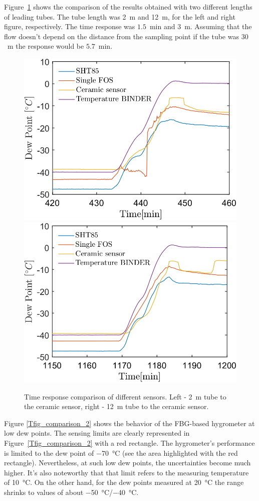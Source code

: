 Figure~\ref{fig_comparison_hw} shows the comparison of the results obtained with two different lengths of leading tubes. The tube length was \SI{2}{\metre} and \SI{12}{\metre}, for the left and right figure, respectively. The time response was $1.5$~min and $3$~m. Assuming that the flow doesn't depend on the distance from the sampling point if the tube was $30$~m the response would be $5.7$~min. 
\begin{figure}[!h]
\centering
\includegraphics[width=0.47\columnwidth]{Chapter5/images/DPCPercent_response2m.png}
\includegraphics[width=0.47\columnwidth]{Chapter5/images/DPCPercent_response12m.png}
\caption{Time response comparison of different sensors. Left - \SI{2}{\metre} tube to the ceramic sensor, right - \SI{12}{\metre} tube to the ceramic sensor.}
\label{fig_comparison_hw}
\end{figure}
\newpage
Figure \ref{Tfig_comparison_2} shows the behavior of the \gls{FBG}-based hygrometer at low dew points. The sensing limits are clearly represented in Figure~\ref{Tfig_comparison_2} with a red rectangle. The hygrometer's performance is limited to the dew point of \SI{-70}{\celsius} (see the area highlighted with the red rectangle). Nevertheless, at such low dew points, the uncertainties become much higher. It's also noteworthy that that limit refers to the measuring temperature of \SI{10}{\celsius}. On the other hand, for the dew points measured at \SI{20}{\celsius} the range shrinks to values of about \SI{-50}{\celsius}/\SI{-40}{\celsius}.

